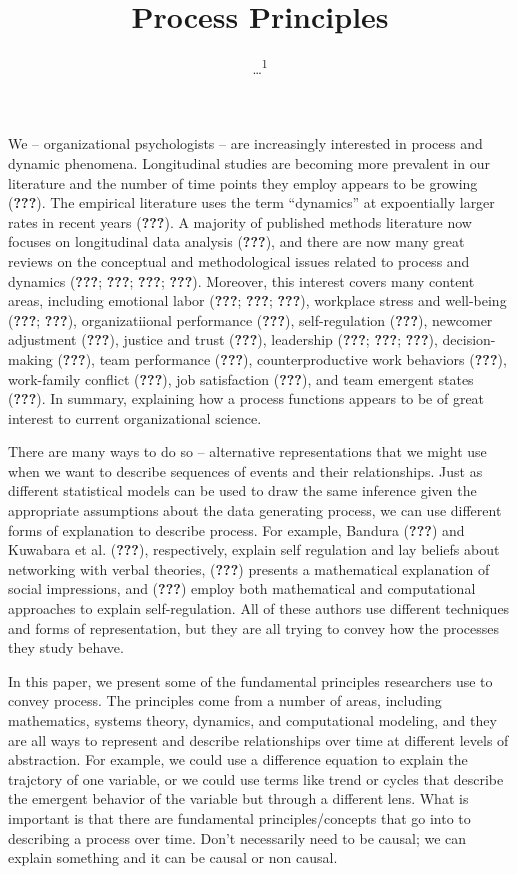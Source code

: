 \documentclass[english,,man]{apa6}
\title{Process Principles}
\author{\ldots{}\textsuperscript{1}}
\date{}
\affiliation{
\vspace{0.5cm}
\textsuperscript{1} ...}
\theoremstyle{definition}
\theoremstyle{definition}
\theoremstyle{definition}
\theoremstyle{remark}
\begin{document}
\maketitle

We -- organizational psychologists -- are increasingly interested in
process and dynamic phenomena. Longitudinal studies are becoming more
prevalent in our literature and the number of time points they employ
appears to be growing ({\textbf{???}}). The empirical literature uses
the term \enquote{dynamics} at expoentially larger rates in recent years
({\textbf{???}}). A majority of published methods literature now focuses
on longitudinal data analysis ({\textbf{???}}), and there are now many
great reviews on the conceptual and methodological issues related to
process and dynamics ({\textbf{???}}; {\textbf{???}}; {\textbf{???}};
{\textbf{???}}). Moreover, this interest covers many content areas,
including emotional labor ({\textbf{???}}; {\textbf{???}};
{\textbf{???}}), workplace stress and well-being ({\textbf{???}};
{\textbf{???}}), organizatiional performance ({\textbf{???}}),
self-regulation ({\textbf{???}}), newcomer adjustment ({\textbf{???}}),
justice and trust ({\textbf{???}}), leadership ({\textbf{???}};
{\textbf{???}}; {\textbf{???}}), decision-making ({\textbf{???}}), team
performance ({\textbf{???}}), counterproductive work behaviors
({\textbf{???}}), work-family conflict ({\textbf{???}}), job
satisfaction ({\textbf{???}}), and team emergent states
({\textbf{???}}). In summary, explaining how a process functions appears
to be of great interest to current organizational science.

There are many ways to do so -- alternative representations that we
might use when we want to describe sequences of events and their
relationships. Just as different statistical models can be used to draw
the same inference given the appropriate assumptions about the data
generating process, we can use different forms of explanation to
describe process. For example, Bandura ({\textbf{???}}) and Kuwabara et
al. ({\textbf{???}}), respectively, explain self regulation and lay
beliefs about networking with verbal theories, ({\textbf{???}}) presents
a mathematical explanation of social impressions, and ({\textbf{???}})
employ both mathematical and computational approaches to explain
self-regulation. All of these authors use different techniques and forms
of representation, but they are all trying to convey how the processes
they study behave.

In this paper, we present some of the fundamental principles researchers
use to convey process. The principles come from a number of areas,
including mathematics, systems theory, dynamics, and computational
modeling, and they are all ways to represent and describe relationships
over time at different levels of abstraction. For example, we could use
a difference equation to explain the trajctory of one variable, or we
could use terms like trend or cycles that describe the emergent behavior
of the variable but through a different lens. What is important is that
there are fundamental principles/concepts that go into to describing a
process over time. Don't necessarily need to be causal; we can explain
something and it can be causal or non causal.
\end{document}
